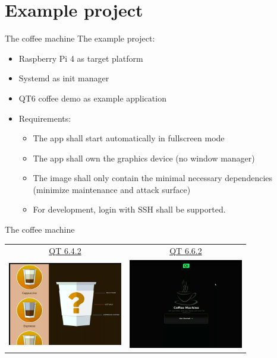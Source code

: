 \documentclass{beamer}
\begin{document}
\section{Example project}

\begin{frame}{The coffee machine}
	The example project:
	\begin{itemize}
		\item Raspberry Pi 4 as target platform
		\item Systemd as init manager
		\item QT6 coffee demo as example application
		\item Requirements:
		\begin{itemize}
			\item The app shall start automatically in fullscreen mode
			\item The app shall own the graphics device (no window manager)
			\item The image shall only contain the minimal necessary dependencies (minimize maintenance and attack surface)
			\item For development, login with SSH shall be supported.
		\end{itemize}
	\end{itemize}
\end{frame}

\begin{frame}{The coffee machine}
	\begin{tabular}{cc}
		\href{https://github.com/qt/qtdoc/tree/v6.4.2/examples/demos/coffee}{QT 6.4.2} &
		\href{https://github.com/qt/qtdoc/tree/v6.6.2/examples/demos/coffee}{QT 6.6.2} \\
		\includegraphics[width=5cm]{assets/Screenshot_Coffee_QT6.4.2.png} &
		\includegraphics[width=5cm]{assets/Screenshot_Coffee_QT6.6.2.png} \\
	\end{tabular}
\end{frame}
\end{document}
